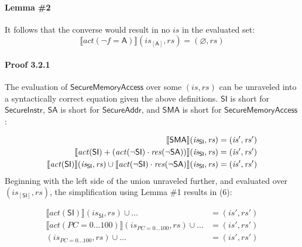 \documentclass[12pt, letterpaper]{article}
\let\emptyset\varnothing
\newcommand\interp[1]{\llbracket #1 \rrbracket}
\begin{document}
 \paragraph{Lemma \#2}
     It follows that the converse would result in no $\mathit{is}$ in the evaluated set:
 \[
     \interp{ act(\neg f=\mathsf{A}) } (\mathit{is}_{[\mathsf{A}]}, \mathit{rs}) = (\emptyset, \mathit{rs})
 \]

 \paragraph{Proof 3.2.1}
     The evaluation of $\mathsf{SecureMemoryAccess}$ over some $(\mathit{is},\mathit{rs})$ can be unraveled into a syntactically correct equation given the above definitions.  $\mathsf{SI}$ is short for $\mathsf{SecureInstr}$, $\mathsf{SA}$ is short for $\mathsf{SecureAddr}$, and $\mathsf{SMA}$ is short for $\mathsf{SecureMemoryAccess}$:
 \par\nobreak
 {\fontsize{10pt}{12pt}\selectfont
 \begin{align}
     \setcounter{equation}{0}
     \interp{ \mathsf{SMA} } (\mathit{is_{\mathsf{SI}}}, \mathit{rs})
     &=
     (\mathit{is}', \mathit{rs}')
     \\
     \interp{ \mathit{act}(\mathsf{SI}) +
     (\mathit{act}(\neg\mathsf{SI}) \cdot
      \mathit{res}(\neg\mathsf{SA})) } (\mathit{is_{\mathsf{SI}}}, \mathit{rs})
     &=
     (\mathit{is}', \mathit{rs}')
     \\
     \interp{ \mathit{act}(\mathsf{SI}) } (\mathit{is_{\mathsf{SI}}}, \mathit{rs}) \cup %
     \interp{ \mathit{act}(\neg\mathsf{SI}) \cdot
      \mathit{res}(\neg\mathsf{SA}) } (\mathit{is_{\mathsf{SI}}}, \mathit{rs})
     &=
     (\mathit{is}', \mathit{rs}')
 \end{align}
 }%
     Beginning with the left side of the union unraveled further, and evaluated over $(\mathit{is}_{[\mathsf{SI}]},\mathit{rs})$, the simplification using Lemma \#1 results in (6):
 \par\nobreak
 {\fontsize{10pt}{12pt}\selectfont
 \begin{align}
     \interp{ \mathit{act} (\mathsf{SI}) } (\mathit{is_{\mathsf{SI}}}, \mathit{rs}) \cup \ldots
     &=
     (\mathit{is}', \mathit{rs}')
     \\
     \interp{ \mathit{act} (PC=0\ldots 100) } (\mathit{is_{PC=0\ldots100}}, \mathit{rs}) \cup \ldots %
     &=
     (\mathit{is}', \mathit{rs}')
     \\
     (\mathit{is_{PC=0\ldots100}}, \mathit{rs}) \cup \ldots 
     &=
     (\mathit{is}', \mathit{rs}')
 \end{align}
 }%
\end{document}
